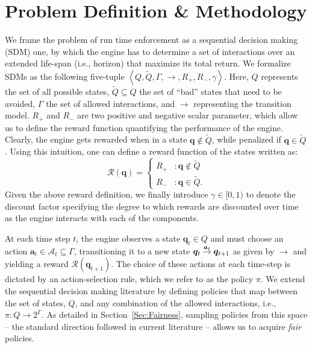 \section{Problem Definition \& Methodology }
We frame the problem of run time enforcement as a sequential decision making (SDM) one, by which the engine has to determine a set of interactions over an extended life-span (i.e., horizon) that maximize its total return. We formalize SDMs as the following five-tuple $\left \langle Q, \tilde{Q},\Gamma, \rightarrow, {R}_{+}, {R}_{-}, \gamma \right\rangle$. Here, $Q$ represents the set of all possible states, $\tilde{Q} \subseteq Q$ the set of ``bad'' states that need to be avoided, $\Gamma$ the set of allowed interactions, and $\rightarrow$ representing the transition model. $R_{+}$ and ${R}_{-}$ are two positive and negative scalar parameter, which allow us to define the reward function quantifying the performance of the engine. Clearly, the engine gets rewarded when in a state $\bm{q} \notin \tilde{Q}$, while penalized if $\bm{q} \in \tilde{Q}$. Using this intuition, one can define a reward function of the states written as: 
   \begin{displaymath}
   \mathcal{R}(\bm{q}) = \left\{
     \begin{array}{lr}
       R_{+} & :  \bm{q} \notin \tilde{Q} \\
       R_{-} & : \bm{q} \in \tilde{Q}.
     \end{array}
   \right.
\end{displaymath} 
Given the above reward definition, we finally introduce $\gamma \in [0,1)$ to denote the discount factor specifying the degree to which rewards are discounted over time as the engine interacts with each of the components. 


At each time step $t$, the engine observes a state $\bm{q}_{t} \in Q$ and must choose an action $\bm{a}_{t} \in \mathcal{A}_{t} \subseteq \Gamma$, transitioning it to a new state $\bm{q}_{t} \goesto[\bm{a}_{t}]\bm{q}_{t+1}$ as given by $\rightarrow$ and yielding a reward $\mathcal{R}\left(\bm{q}_{t+1}\right)$. The choice of these actions at each time-step is dictated by an action-selection rule, which we refer to as the policy $\pi$. We extend the sequential decision making literature by defining policies that map between the set of states, $Q$, and any combination of the allowed interactions, i.e., $\pi: Q \rightarrow 2^{\Gamma}$. As detailed in Section~\ref{Sec:Fairness}, sampling policies from this space -- the standard direction followed in current literature -- allows us to acquire \emph{fair} policies. 


